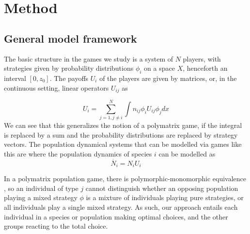 \section{Method}


\subsection*{General model framework}



The basic structure in the games we study is a system of $N$ players, with strategies  given by probability distributions $\phi_i$ on a space $X$, henceforth an interval $[0,z_0]$. The payoffs $U_i$ of the players are given by matrices, or, in the continuous setting, linear operators $U_{ij}$ as

\begin{equation}
  \label{eq:utility}
  U_i = \sum_{j=1,j\neq i}^N \int n_{ij}\phi_i U_{ij} \phi_j dx%
\end{equation}
We can see that this generalizes the notion of a polymatrix  game, if the integral is replaced by a sum and the probability distributions are replaced by strategy vectors. The population dynamical systems that can be modelled via games like this are where the population dynamics of species $i$ can be modelled as
\begin{equation}
  \dot{N_i} = N_i U_i
\end{equation}
  
In a polymatrix population game, there is polymorphic-monomorphic equivalence \citep{broom2013game}, so an individual of type $j$ cannot distinguish whether an opposing population playing a mixed strategy $\phi$ is a mixture of individuals playing pure strategies, or all individuals play a single mixed strategy. As such, our approach entails each individual in a species or population making optimal choices, and the other groups reacting to the total choice.

